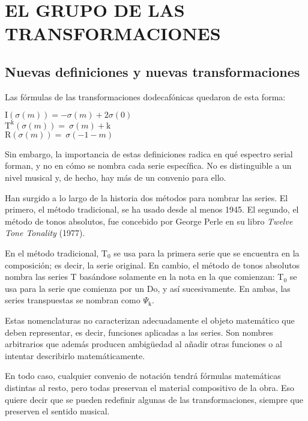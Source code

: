 \section{EL GRUPO DE LAS TRANSFORMACIONES}\label{ch:grupo}
	\subsection{Nuevas definiciones y nuevas transformaciones}
		Las f\'ormulas de las transformaciones dodecaf\'onicas quedaron de esta forma:
				
		\begin{center}
		$\mbox{I}(\sigma(m))= -\sigma(m) + 2\sigma(0)$\\
		$\mbox{T}^{\mbox{k}}(\sigma(m))=\ \sigma(m) + \mbox{k}$\\
		$\mbox{R}(\sigma(m))=\ \sigma(-1-m)$
		\end{center}
			
		Sin embargo, la importancia de estas definiciones radica en qu\'e espectro serial forman, y no en c\'omo se nombra cada serie espec\'ifica. No es distinguible a un nivel musical y, de hecho, hay m\'as de un convenio para ello.
		
		Han surgido a lo largo de la historia dos m\'etodos para nombrar las series. El primero, el m\'etodo tradicional, se ha usado desde al menos 1945. El segundo, el m\'etodo de tonos absolutos, fue concebido por George Perle en su libro \emph{Twelve Tone Tonality} (1977).
		
		En el m\'etodo tradicional, T$_0$ se usa para la primera serie que se encuentra en la composici\'on; es decir, la serie original. En cambio, el m\'etodo de tonos absolutos nombra las series T bas\'andose solamente en la nota en la que comienzan: T$_0$ se usa para la serie que comienza por un Do, y as\'i sucesivamente. En ambas, las series transpuestas se nombran como $\Psi_{\mbox{k}}$.
		
		Estas nomenclaturas no caracterizan adecuadamente el objeto matem\'atico que deben representar, es decir, funciones aplicadas a las series. Son nombres arbitrarios que adem\'as producen ambig\"uedad al a\~nadir otras funciones o al intentar describirlo matem\'aticamente.
		
		En todo caso, cualquier convenio de notaci\'on tendr\'a f\'ormulas matem\'aticas distintas al resto, pero todas preservan el material compositivo de la obra. Eso quiere decir que se pueden redefinir algunas de las transformaciones, siempre que preserven el sentido musical. 
		
